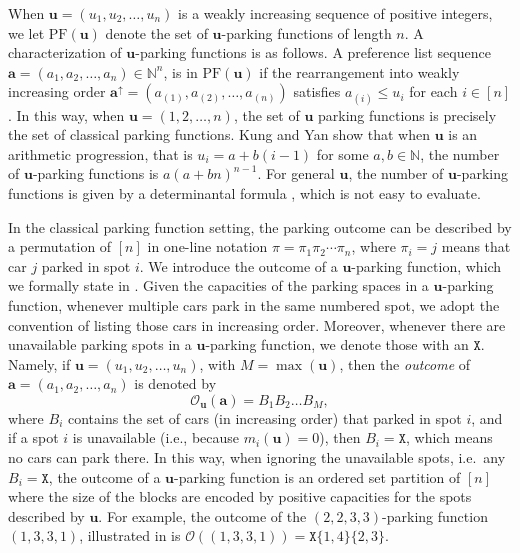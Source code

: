 \documentclass[reqno]{amsart}
\newcommand{\X}{\texttt{X}}
\newcommand{\PF}{\mathrm{PF}}
\theoremstyle{definition}
\theoremstyle{remark}
\newcommand{\NN}{\mathbb{N}}
\newcommand{\out}{\mathcal{O}}
\newcommand{\bsy}{\boldsymbol}
\begin{document}
When $\bsy{u} = (u_1, u_2, \ldots, u_n)$ is a weakly increasing sequence of positive integers, we let $\PF(\bsy{u})$ denote the set of $\bsy{u}$-parking functions of length $n$. 
A characterization of $\bsy{u}$-parking functions is as follows. 
A preference list sequence $\bsy{a} = (a_1, a_2, \ldots, a_n) \in \mathbb{N}^n$, is in $\PF(\bsy{u})$ if the rearrangement into weakly increasing order $\bsy{a}^\uparrow=(a_{(1)},a_{(2)},\ldots,a_{(n)})$ satisfies $a_{(i)} \leq u_i$ for each $i\in[n]$. 
In this way, when $\bsy{u}=(1,2,\ldots,n)$, the set of $\bsy{u}$ parking functions is precisely the set of classical parking functions. Kung and Yan \cite{KungYan} show that when $\bsy{u}$ is an arithmetic progression, that is $u_i=a+b(i-1)$ for some $a,b \in \NN$, the number of $\bsy{u}$-parking functions is $a(a+bn)^{n-1}$. 
For general $\bsy{u}$, the number of $\bsy{u}$-parking functions is given by a determinantal formula \cites{KungYan, PitmanStanley}, which is not easy to evaluate. 


In the classical parking function setting, the parking outcome can be described by a permutation of $[n]$ in one-line notation $\pi=\pi_1\pi_2\cdots\pi_n$, where $\pi_i=j$ means that car $j$ parked in spot $i$. 
We introduce the outcome of a $\bsy{u}$-parking function, which we formally state in . 
Given the capacities of the parking spaces in a $\bsy{u}$-parking function, 
whenever multiple cars park in the same numbered spot, we adopt the convention of listing those cars in increasing order.
Moreover, whenever there are unavailable parking spots in a $\bsy{u}$-parking function, we denote those with an $\X$.
Namely, if $\bsy{u}=(u_1,u_2,\ldots,u_n)$, with $M=\max(\bsy{u})$, then
the \emph{outcome} of $\bsy{a}=(a_1,a_2,\ldots,a_n)$ is denoted by \[ \out_{\bsy{u}}(\bsy{a})=B_1B_2\ldots B_M,\] where $B_i$ contains the set of cars (in increasing order) that parked in spot $i$, and if a spot $i$ is unavailable (i.e., because $m_i(\bsy{u})=0$), then $B_i=\X$, which means no cars can park there.
In this way, {when ignoring the unavailable spots, i.e.\ any $B_i=\X$}, the outcome of a $\bsy{u}$-parking function is an {ordered} set partition of $[n]$ where the size of the blocks are encoded by positive capacities for the spots described by $\bsy{u}$. For example, the outcome of the $(2,2,3,3)$-parking function  $(1,3,3,1)$, illustrated in  is $\out((1,3,3,1))=
\X\{1,4\}\{2,3\}$.
\end{document}
